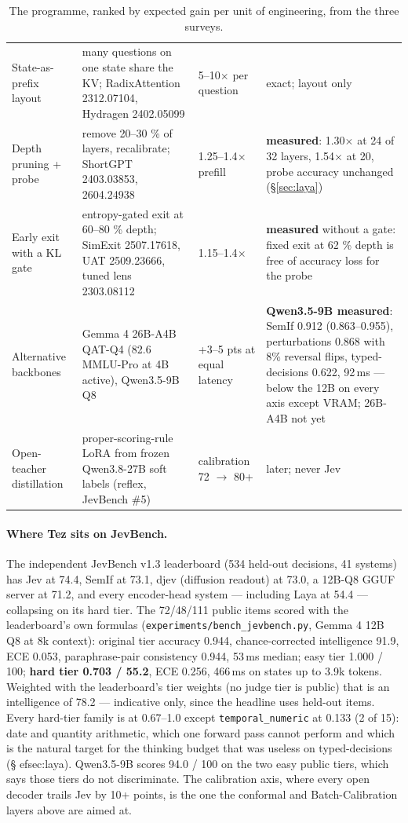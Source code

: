 \documentclass[11pt,a4paper]{article}
\newcommand{\code}[1]{\texttt{#1}}
\begin{document}
\begin{table}[H]
\begin{tabularx}{\textwidth}{L{34mm} X L{30mm} L{26mm}}
State-as-prefix layout & many questions on one state share the KV; RadixAttention 2312.07104, Hydragen 2402.05099 & 5--10$\times$ per question & exact; layout only \\
Depth pruning + probe & remove 20--30 \% of layers, recalibrate; ShortGPT 2403.03853, 2604.24938 & 1.25--1.4$\times$ prefill & \textbf{measured}: 1.30$\times$ at 24 of 32 layers, 1.54$\times$ at 20, probe accuracy unchanged (\S\ref{sec:laya}) \\
Early exit with a KL gate & entropy-gated exit at 60--80 \% depth; SimExit 2507.17618, UAT 2509.23666, tuned lens 2303.08112 & 1.15--1.4$\times$ & \textbf{measured} without a gate: fixed exit at 62 \% depth is free of accuracy loss for the probe \\
Alternative backbones & Gemma 4 26B-A4B QAT-Q4 (82.6 MMLU-Pro at 4B active), Qwen3.5-9B Q8 & +3--5 pts at equal latency & \textbf{Qwen3.5-9B measured}: SemIf 0.912 (0.863--0.955), perturbations 0.868 with 8\% reversal flips, typed-decisions 0.622, 92\,ms --- below the 12B on every axis except VRAM; 26B-A4B not yet \\
Open-teacher distillation & proper-scoring-rule LoRA from frozen Qwen3.8-27B soft labels (reflex, JevBench \#5) & calibration 72 $\to$ 80+ & later; never Jev \\
\bottomrule
\end{tabularx}
\caption{The programme, ranked by expected gain per unit of engineering, from the three surveys.}
\end{table}

\paragraph{Where Tez sits on JevBench.} The independent JevBench v1.3 leaderboard (534 held-out decisions, 41 systems) has Jev at 74.4, SemIf at 73.1, djev (diffusion readout) at 73.0, a 12B-Q8 GGUF server at 71.2, and every encoder-head system --- including Laya at 54.4 --- collapsing on its hard tier. The 72/48/111 public items scored with the leaderboard's own formulas (\code{experiments/bench\_jevbench.py}, Gemma 4 12B Q8 at 8k context): original tier accuracy 0.944, chance-corrected intelligence 91.9, ECE 0.053, paraphrase-pair consistency 0.944, 53\,ms median; easy tier 1.000 / 100; \textbf{hard tier 0.703 / 55.2}, ECE 0.256, 466\,ms on states up to 3.9k tokens. Weighted with the leaderboard's tier weights (no judge tier is public) that is an intelligence of 78.2 --- indicative only, since the headline uses held-out items. Every hard-tier family is at 0.67--1.0 except \code{temporal\_numeric} at 0.133 (2 of 15): date and quantity arithmetic, which one forward pass cannot perform and which is the natural target for the thinking budget that was useless on typed-decisions (\S
ef{sec:laya}). Qwen3.5-9B scores 94.0 / 100 on the two easy public tiers, which says those tiers do not discriminate. The calibration axis, where every open decoder trails Jev by 10+ points, is the one the conformal and Batch-Calibration layers above are aimed at.
\end{document}

